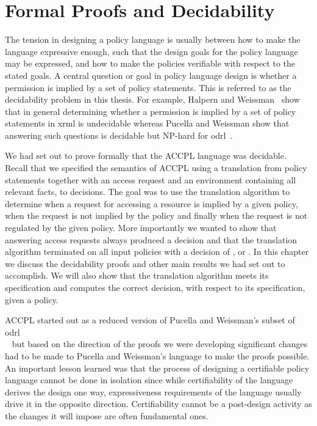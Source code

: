 \chapter{Formal Proofs and Decidability}\label{chap:results}

                  
The tension in designing a policy language is usually between how to make the language expressive enough, such that the design goals for the policy language may be expressed, and how to make the policies verifiable with respect to the stated goals. A central question or goal in policy language design is whether a permission is implied by a set of policy statements. This is referred to as the decidability problem in this thesis. For example, Halpern and Weissman~\cite{HalpernW08} show that in general determining whether a permission is implied by a set of policy statements in \ac{xrml} is undecidable whereas Pucella and Weissman show that answering such questions is decidable but NP-hard for \ac{odrl}~\cite{pucella2006}.
 

We had set out to prove formally that the \ac{ACCPL} language was decidable. Recall that we specified the semantics of \ac{ACCPL} using a translation from policy statements together with an access request and an environment containing all relevant facts, to decisions. The goal was to use the translation algorithm to determine when a request for accessing a resource is implied by a given policy, when the request is not implied by the policy and finally when the request is not regulated by the given policy. More importantly we wanted to show that answering access requests always produced a decision and that the translation algorithm terminated on all input policies with a decision of ,  or . In this chapter we discuss the decidability proofs and other main results we had set out to accomplish. We will also show that the translation algorithm meets its specification and computes the correct decision, with respect to its specification, given a policy. 


\ac{ACCPL} started out as a reduced version of Pucella and Weissman's subset of \ac{odrl}\\~\cite{pucella2006} but based on the direction of the proofs we were developing significant changes had to be made to Pucella and Weissman's language to make the proofs possible. An important lesson learned was that the process of designing a certifiable policy language cannot be done in isolation since while certifiability of the language derives the design one way, expressiveness requirements of the language usually drive it in the opposite direction. Certifiability cannot be a post-design activity as the changes it will impose are often fundamental ones.

